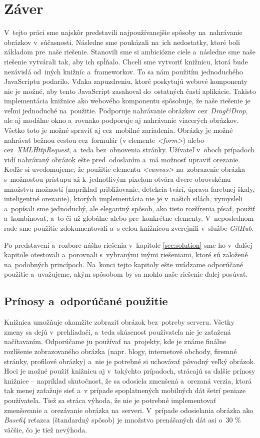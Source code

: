 \chapter{Záver}
V~tejto práci sme najskôr predstavili najpoužívanejšie spôsoby na~nahrávanie obrázkov v~súčasnosti. Následne sme poukázali na~ich nedostatky, ktoré boli základom pre~naše riešenie. Stanovili sme si ambiciózne ciele a~následne sme naše riešenie vytvárali tak, aby ich spĺňalo.
Chceli sme vytvoriť knižnicu, ktorá bude nezávislá od~iných knižníc a~frameworkov. To sa nám použitím jednoduchého JavaScriptu podarilo. Vďaka zapuzdreniu, ktoré poskytujú webové komponenty nie je možné, aby tento JavaScript zasahoval do~ostatných častí aplikácie. Takisto implementácia knižnice ako webového  komponentu spôsobuje, že naše riešenie je veľmi jednoduché na~použitie.
Podporuje nahrávanie obrázkov cez~\emph{Drag\&Drop}, ale aj modálne okno a~rovnako podporuje aj nahrávanie viacerých obrázkov. Všetko toto je možné spraviť aj cez~mobilné zariadenia. Obrázky je možné nahrávať bežnou cestou cez~formulár (v elemente \emph{<form>}) alebo cez~\emph{XMLHttpRequest}, a~teda bez~obnovenia stránky. Užívateľ v~oboch prípadoch vidí nahrávaný obrázok ešte pred~odoslaním a~má možnosť upraviť orezanie.
Keďže si uvedomujeme, že použitie elementu \emph{<canvas>} na~zobrazenie obrázka s~možnosťou prístupu až k~jednotlivým pixelom otvára dvere obrovskému množstvu možností (napríklad približovanie, detekcia tvárí, úprava farebnej škaly, inteligentné orezanie), ktorých implementácia nie je v~našich silách, vymysleli a~popísali sme jednoduchý, ale elegantný spôsob, ako tieto rozšírenia písať, použiť a~kombinovať, a~to či už globálne alebo pre~konkrétne elementy. V~neposlednom rade sme použitie zdokumentovali a~s celou knižnicou zverejnili v~službe \emph{GitHub}.

Po predstavení a~rozbore nášho riešenia v~kapitole \ref{sec:solution} sme ho v~ďalšej kapitole otestovali a~porovnali s~vybranými inými riešeniami, ktoré sú založené na~podobných princípoch. Na~konci tejto kapitoly ešte uvádzame odporúčané použitie a~uvažujeme, akým spôsobom by sa mohlo naše riešenie ďalej posúvať. 


\section{Prínosy a~odporúčané použitie}

Knižnica umožňuje okamžite zobraziť obrázok bez~potreby serveru. Všetky zmeny sa dejú v~prehliadači, a~teda skúsenosť používateľa nie je zaťažená načítavaním. Odporúčame ju používať na~projekty, kde je známe finálne rozlíšenie zobrazovaného obrázka (napr. blogy, internetové obchody, firemné stránky, profilové obrázky) a~nie je potrebné si uchovávať pôvodný veľký obrázok. Hoci je možné použiť knižnicu aj v~takýchto prípadoch, strácajú sa ďalšie prínosy knižnice -- napríklad skutočnosť, že sa odosiela zmenšená a~orezaná verzia, ktorá tak menej zaťažuje sieť a~v prípade spoplatnených mobilných dát šetrí peniaze používateľa. Tiež sa stráca výhoda, že nie je potrebné implementovať zmenšovanie a~orezávanie obrázka na~serveri. V~prípade odosielania obrázka ako \emph{Base64} reťazca (štandardný spôsob) je množstvo prenášaných dát asi o~30 \% väčšie, čo je tiež nevýhoda.


